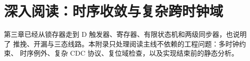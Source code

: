\chapter{深入阅读：时序收敛与复杂跨时钟域}

第三章已经从锁存器走到 D 触发器、寄存器、有限状态机和两级同步器，也说明了
推挽、开漏与三态线路。本附录只处理阅读主线不依赖的工程问题：多时钟约束、
时序例外、复杂 CDC 协议、复位域检查，以及实现结束前的静态分析。

\maybeskip


